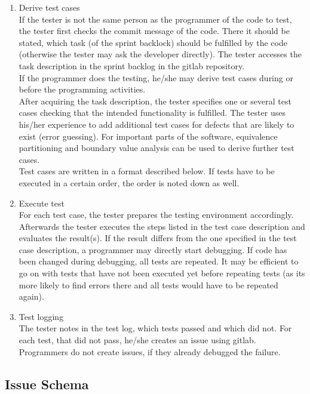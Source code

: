 \documentclass[twoside,12pt,a4paper]{article}
\begin{document}
\begin{enumerate}
 	\item Derive test cases \\
 	If the tester is not the same person as the programmer of the code to test, the tester first checks the commit message of the code. There it should be stated, which task (of the sprint backlock) should be fulfilled by the code (otherwise the tester may ask the developer directly). The tester accesses the task description in the sprint backlog in the gitlab repository. \\
 	If the programmer does the testing, he/she may derive test cases during or before the programming activities. \\
 	After acquiring the task description, the tester specifies one or several test cases checking that the intended functionality is fulfilled. The tester uses his/her experience to add additional test cases for defects that are likely to exist (error guessing). For important parts of the software, equivalence partitioning and boundary value analysis can be used to derive further test cases. \\
 	Test cases are written in a format described below. If tests have to be executed in a certain order, the order is noted down as well.

 	\item Execute test \\
 	For each test case, the tester prepares the testing environment accordingly. Afterwards the tester executes the steps listed in the test case description and evaluates the result(s). If the result differs from the one specified in the test case description, a programmer may directly start debugging. If code has been changed during debugging, all tests are repeated. It may be efficient to go on with tests that have not been executed yet before repeating tests (as its more likely to find errors there and all tests would have to be repeated again).

 	\item Test logging \\
 	The tester notes in the test log, which tests passed and which did not. For each test, that did not pass, he/she creates an issue using gitlab. Programmers do not create issues, if they already debugged the failure.

\end{enumerate}

\newpage

\subsection{Issue Schema} %
\label{sub:issue_schema}
\end{document}
